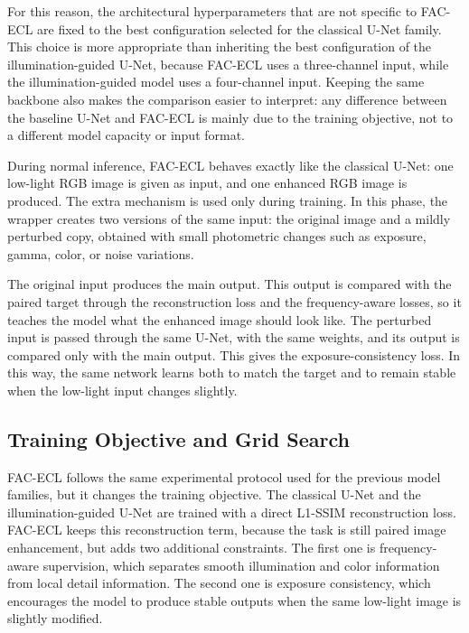 For this reason, the architectural hyperparameters that are not specific to FAC-ECL are fixed to the best configuration selected for the classical U-Net family. This choice is more appropriate than inheriting the best configuration of the illumination-guided U-Net, because FAC-ECL uses a three-channel input, while the illumination-guided model uses a four-channel input. Keeping the same backbone also makes the comparison easier to interpret: any difference between the baseline U-Net and FAC-ECL is mainly due to the training objective, not to a different model capacity or input format.

During normal inference, FAC-ECL behaves exactly like the classical U-Net: one low-light RGB image is given as input, and one enhanced RGB image is produced. The extra mechanism is used only during training. In this phase, the wrapper creates two versions of the same input: the original image and a mildly perturbed copy, obtained with small photometric changes such as exposure, gamma, color, or noise variations.

The original input produces the main output. This output is compared with the paired target through the reconstruction loss and the frequency-aware losses, so it teaches the model what the enhanced image should look like. The perturbed input is passed through the same U-Net, with the same weights, and its output is compared only with the main output. This gives the exposure-consistency loss. In this way, the same network learns both to match the target and to remain stable when the low-light input changes slightly.

\subsection{Training Objective and Grid Search}

FAC-ECL follows the same experimental protocol used for the previous model families, but it changes the training objective. The classical U-Net and the illumination-guided U-Net are trained with a direct L1-SSIM reconstruction loss. FAC-ECL keeps this reconstruction term, because the task is still paired image enhancement, but adds two additional constraints. The first one is frequency-aware supervision, which separates smooth illumination and color information from local detail information. The second one is exposure consistency, which encourages the model to produce stable outputs when the same low-light image is slightly modified.

